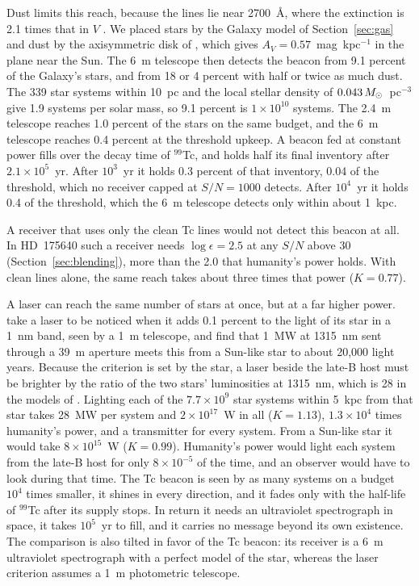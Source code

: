 \documentclass[final,5p]{elsarticle}
\begin{document}
Dust limits this reach, because the  lines lie near 2700~\AA, where the extinction is 2.1 times that in $V$ \citep{Gordon2023}. We placed stars by the Galaxy model of Section~\ref{sec:gas} and dust by the axisymmetric disk of \citet{DrimmelSpergel2001}, which gives $A_V = 0.57$~mag~kpc$^{-1}$ in the plane near the Sun. The 6~m telescope then detects the beacon from 9.1 percent of the Galaxy's stars, and from 18 or 4 percent with half or twice as much dust. The 339 star systems within 10~pc \citep{Reyle2021} and the local stellar density of $0.043\,M_\odot$~pc$^{-3}$ \citep{McKee2015} give 1.9 systems per solar mass, so 9.1 percent is $1\times10^{10}$ systems. The 2.4~m telescope reaches 1.0 percent of the stars on the same budget, and the 6~m telescope reaches 0.4 percent at the threshold upkeep. A beacon fed at constant power fills over the decay time of $^{99}$Tc, and holds half its final inventory after $2.1\times10^{5}$~yr. After $10^{3}$~yr it holds 0.3 percent of that inventory, 0.04 of the threshold, which no receiver capped at $S/N = 1000$ detects. After $10^{4}$~yr it holds 0.4 of the threshold, which the 6~m telescope detects only within about 1~kpc.

A receiver that uses only the clean Tc lines would not detect this beacon at all. In HD~175640 such a receiver needs $\log\epsilon = 2.5$ at any $S/N$ above 30 (Section~\ref{sec:blending}), more than the 2.0 that humanity's power holds. With clean lines alone, the same reach takes about three times that power ($K = 0.77$).

A laser can reach the same number of stars at once, but at a far higher power. \citet{ClarkCahoy2018} take a laser to be noticed when it adds 0.1 percent to the light of its star in a 1~nm band, seen by a 1~m telescope, and find that 1~MW at 1315~nm sent through a 39~m aperture meets this from a Sun-like star to about 20{,}000 light years. Because the criterion is set by the star, a laser beside the late-B host must be brighter by the ratio of the two stars' luminosities at 1315~nm, which is 28 in the models of \citet{CastelliKurucz2003}. Lighting each of the $7.7\times10^{9}$ star systems within 5~kpc from that star takes 28~MW per system and $2\times10^{17}$~W in all ($K = 1.13$), $1.3\times10^{4}$ times humanity's power, and a transmitter for every system. From a Sun-like star it would take $8\times10^{15}$~W ($K = 0.99$). Humanity's power would light each system from the late-B host for only $8\times10^{-5}$ of the time, and an observer would have to look during that time. The Tc beacon is seen by as many systems on a budget $10^{4}$ times smaller, it shines in every direction, and it fades only with the half-life of $^{99}$Tc after its supply stops. In return it needs an ultraviolet spectrograph in space, it takes $10^{5}$~yr to fill, and it carries no message beyond its own existence. The comparison is also tilted in favor of the Tc beacon: its receiver is a 6~m ultraviolet spectrograph with a perfect model of the star, whereas the laser criterion assumes a 1~m photometric telescope.
\end{document}
